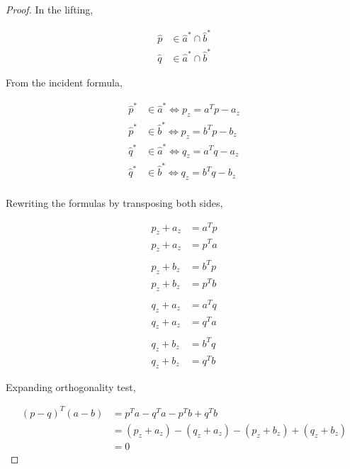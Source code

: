 \documentclass{article}
\begin{document}
    \begin{proof}
        In the lifting, 
    
        \begin{align*}
            \hat{p} &\in \hat{a}^* \cap \hat{b}^* \\
            \hat{q} &\in \hat{a}^* \cap \hat{b}^*
        \end{align*}
        
        From the incident formula,
        
        \begin{align*}
            \hat{p}^* &\in \hat{a}^* \Leftrightarrow p_z = a^Tp-a_z \\
            \hat{p}^* &\in \hat{b}^* \Leftrightarrow p_z = b^Tp-b_z \\
            \hat{q}^* &\in \hat{a}^* \Leftrightarrow q_z = a^Tq-a_z \\
            \hat{q}^* &\in \hat{b}^* \Leftrightarrow q_z = b^Tq-b_z \\
        \end{align*}
        
        Rewriting the formulas by transposing both sides,
    
        \begin{align*}
            p_z + a_z &= a^Tp \\
            p_z + a_z &= p^Ta \\ \\
            p_z + b_z &= b^Tp \\
            p_z + b_z &= p^Tb \\ \\
            q_z + a_z &= a^Tq \\
            q_z + a_z &= q^Ta \\ \\
            q_z + b_z &= b^Tq \\
            q_z + b_z &= q^Tb
        \end{align*}
        
        Expanding orthogonality test,
        
        \begin{align*}
            (p-q)^T(a-b) &= p^Ta - q^Ta - p^Tb + q^Tb \\
            &= (p_z + a_z) - (q_z + a_z) - (p_z + b_z) + (q_z + b_z) \\
            &= 0
        \end{align*}
    \end{proof}
    
\end{document}
